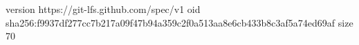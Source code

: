 version https://git-lfs.github.com/spec/v1
oid sha256:f9937df277cc7b217a09f47b94a359c2f0a513aa8e6cb433b8c3af5a74ed69af
size 70
